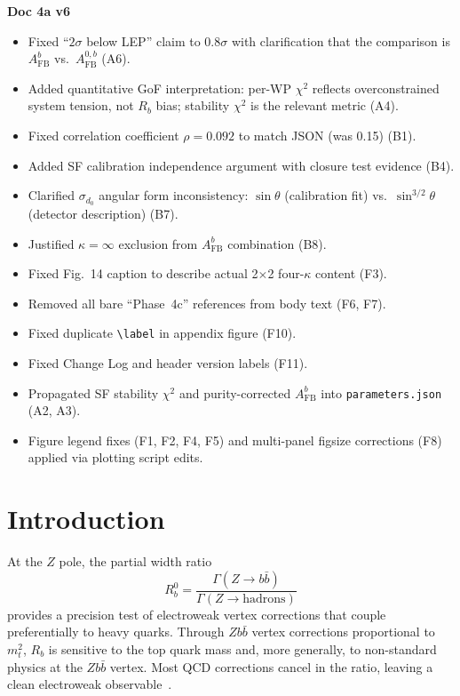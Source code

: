 \documentclass[11pt,a4paper]{article}
\begin{document}
\textbf{Doc 4a v6}
\begin{itemize}
\item Fixed ``$2\sigma$ below LEP'' claim to $0.8\sigma$ with clarification
  that the comparison is $A_\text{FB}^b$ vs.\ $A_\text{FB}^{0,b}$ (A6).
\item Added quantitative GoF interpretation: per-WP $\chi^2$ reflects
  overconstrained system tension, not $R_b$ bias; stability $\chi^2$
  is the relevant metric (A4).
\item Fixed correlation coefficient $\rho = 0.092$ to match JSON (was 0.15) (B1).
\item Added SF calibration independence argument with closure test evidence (B4).
\item Clarified $\sigma_{d_0}$ angular form inconsistency:
  $\sin\theta$ (calibration fit) vs.\ $\sin^{3/2}\theta$ (detector description) (B7).
\item Justified $\kappa = \infty$ exclusion from $A_\text{FB}^b$ combination (B8).
\item Fixed Fig.~14 caption to describe actual 2$\times$2 four-$\kappa$ content (F3).
\item Removed all bare ``Phase~4c'' references from body text (F6, F7).
\item Fixed duplicate \verb|\label| in appendix figure (F10).
\item Fixed Change Log and header version labels (F11).
\item Propagated SF stability $\chi^2$ and purity-corrected $A_\text{FB}^b$
  into \texttt{parameters.json} (A2, A3).
\item Figure legend fixes (F1, F2, F4, F5) and multi-panel figsize
  corrections (F8) applied via plotting script edits.
\end{itemize}

\clearpage

\section{Introduction}
\label{sec:intro}

At the $Z$ pole, the partial width ratio
\begin{equation}
R_b^0 = \frac{\Gamma(Z \to b\bar{b})}{\Gamma(Z \to \text{hadrons})}
\label{eq:Rb_def}
\end{equation}
provides a precision test of electroweak vertex corrections that
couple preferentially to heavy quarks.
Through $Zb\bar{b}$ vertex corrections proportional to $m_t^2$,
$R_b$ is sensitive to the top quark mass and, more generally, to
non-standard physics at the $Zb\bar{b}$ vertex.
Most QCD corrections cancel in the ratio, leaving a clean
electroweak observable~\cite{LEP:EWWG:2005}.
\end{document}
